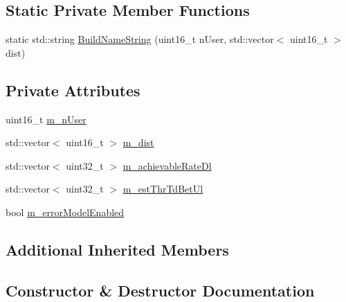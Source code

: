 \subsection*{Static Private Member Functions}
\begin{DoxyCompactItemize}
\item 
static std\+::string \hyperlink{classLenaTdBetFfMacSchedulerTestCase2_ae91404bebb980bd30b77aafc25733975}{Build\+Name\+String} (uint16\+\_\+t n\+User, std\+::vector$<$ uint16\+\_\+t $>$ dist)
\end{DoxyCompactItemize}
\subsection*{Private Attributes}
\begin{DoxyCompactItemize}
\item 
uint16\+\_\+t \hyperlink{classLenaTdBetFfMacSchedulerTestCase2_ae922bc33ece9e8c61eaf4677b8b78f6b}{m\+\_\+n\+User}
\item 
std\+::vector$<$ uint16\+\_\+t $>$ \hyperlink{classLenaTdBetFfMacSchedulerTestCase2_aedff5ffd37cafea8c5409c5a72d9f380}{m\+\_\+dist}
\item 
std\+::vector$<$ uint32\+\_\+t $>$ \hyperlink{classLenaTdBetFfMacSchedulerTestCase2_af342b9db780045b97bfe39fef96fea60}{m\+\_\+achievable\+Rate\+Dl}
\item 
std\+::vector$<$ uint32\+\_\+t $>$ \hyperlink{classLenaTdBetFfMacSchedulerTestCase2_ae303ffad7a84599cdc5d9719e943f4cb}{m\+\_\+est\+Thr\+Td\+Bet\+Ul}
\item 
bool \hyperlink{classLenaTdBetFfMacSchedulerTestCase2_aedf7576a6b04173f851c1d3c074fc292}{m\+\_\+error\+Model\+Enabled}
\end{DoxyCompactItemize}
\subsection*{Additional Inherited Members}


\subsection{Constructor \& Destructor Documentation}

